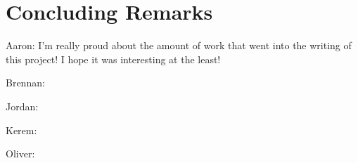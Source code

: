 
\setcounter{chapter}{10}
\chapter{Concluding Remarks}

Aaron: I'm really proud about the amount of work that went into the writing of this project! I hope it was interesting at the least!

Brennan: 

Jordan: 

Kerem: 

Oliver: 